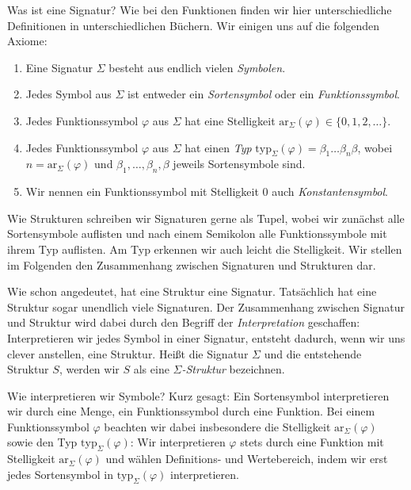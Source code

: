\documentclass{article}
\begin{document}
Was ist eine Signatur? Wie bei den Funktionen finden wir hier unterschiedliche 
Definitionen in unterschiedlichen Büchern. Wir einigen uns auf die folgenden 
Axiome: 
\begin{enumerate}
 \item Eine Signatur $\Sigma$ besteht aus endlich vielen \emph{Symbolen}. 
 \item Jedes Symbol aus $\Sigma$ ist entweder ein \emph{Sortensymbol} oder ein 
\emph{Funktionssymbol}.
 \item Jedes Funktionssymbol $\varphi$ aus $\Sigma$ hat eine Stelligkeit 
$\mathrm{ar}_\Sigma(\varphi)\in\{0,1,2,\ldots\}$. 
 \item Jedes Funktionssymbol $\varphi$ aus $\Sigma$ hat einen \emph{Typ} 
$\mathrm{typ}_\Sigma(\varphi) = \beta_1\ldots \beta_n \beta$, wobei 
$n = \mathrm{ar}_\Sigma(\varphi)$ und $\beta_1,\ldots,\beta_n,\beta$ jeweils 
Sortensymbole sind. 
\item Wir nennen ein Funktionssymbol mit Stelligkeit $0$ auch 
\emph{Konstantensymbol}. 
\end{enumerate}

Wie Strukturen schreiben wir Signaturen gerne als Tupel, wobei wir zunächst 
alle Sortensymbole auflisten und nach einem Semikolon alle Funktionssymbole mit 
ihrem Typ auflisten. Am Typ erkennen wir auch leicht die Stelligkeit. Wir 
stellen im Folgenden den Zusammenhang zwischen Signaturen und Strukturen dar. 

Wie schon angedeutet, hat eine Struktur eine Signatur. Tatsächlich hat eine 
Struktur sogar unendlich viele Signaturen. Der Zusammenhang zwischen Signatur 
und Struktur wird dabei durch den Begriff der \emph{Interpretation} geschaffen: 
Interpretieren wir jedes Symbol in einer Signatur, entsteht dadurch, wenn wir 
uns clever anstellen, eine Struktur. Heißt die Signatur $\Sigma$ und die 
entstehende Struktur $S$, werden wir $S$ als eine \emph{$\Sigma$-Struktur} 
bezeichnen. 

Wie interpretieren wir Symbole? Kurz gesagt: Ein Sortensymbol interpretieren 
wir durch eine Menge, ein Funktionssymbol durch eine Funktion. Bei einem 
Funktionssymbol $\varphi$ beachten wir dabei insbesondere die Stelligkeit 
$\mathrm{ar}_\Sigma(\varphi)$ sowie den Typ $\mathrm{typ}_\Sigma(\varphi)$: Wir 
interpretieren $\varphi$ stets durch eine Funktion mit Stelligkeit 
$\mathrm{ar}_\Sigma(\varphi)$ und wählen Definitions- und Wertebereich, indem 
wir erst jedes Sortensymbol in $\mathrm{typ}_\Sigma(\varphi)$ interpretieren. 
\end{document}
